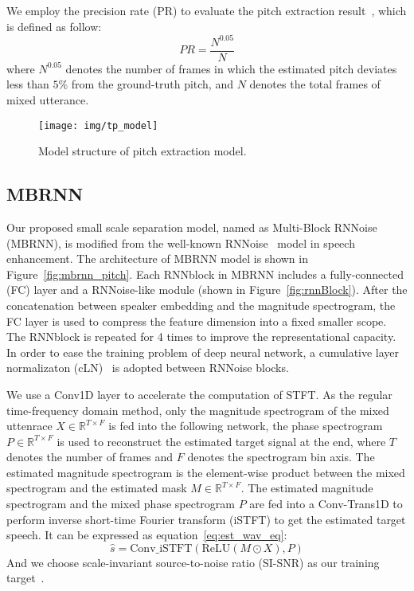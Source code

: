 \documentclass[
]{article}
\begin{document}
    We employ the precision rate (PR) to evaluate the pitch extraction result~\cite{zhang16d_interspeech}, which is defined as follow:
    \begin{equation}
        PR =\frac{N^{0.05}}{N}
    \end{equation}
    where ${N^{0.05}}$ denotes the number of frames in which the estimated pitch deviates less than $5\%$ from the ground-truth pitch, and $N$ denotes the total frames of mixed utterance.

    \begin{figure}[t]
        \centering
        \texttt{[image: img/tp\_model]}
        \caption{Model structure of pitch extraction model.}
        \label{fig:tp_extraction}
    \end{figure}

    \subsection{MBRNN}
    \label{subsec:mbrnn_model}
    Our proposed small scale separation model, named as Multi-Block RNNoise (MBRNN), is modified from the well-known RNNoise~\cite{rnnoise} model in speech enhancement.
    The architecture of MBRNN model is shown in Figure~\ref{fig:mbrnn_pitch}. Each RNNblock in MBRNN includes a fully-connected (FC) layer and a RNNoise-like module (shown in Figure~\ref{fig:rnnBlock}).
    After the concatenation between speaker embedding and the magnitude spectrogram, the FC layer is used to compress the feature dimension into a fixed smaller scope.
    The RNNblock is repeated for 4 times to improve the representational capacity.
    In order to ease the training problem of deep neural network, a cumulative layer normalizaton (cLN)~\cite{conv_tasnet} is adopted between RNNoise blocks.

    We use a Conv1D layer to accelerate the computation of STFT.
    As the regular time-frequency domain method, only the magnitude spectrogram of the mixed uttenrace $X\in\mathbb{R}^{T\times F}$ is fed into the following network, the phase spectrogram $P\in\mathbb{R}^{T\times F}$ is used to reconstruct the estimated target signal at the end, where $T$ denotes the number of frames and $F$ denotes the spectrogram bin axis.
    The estimated magnitude spectrogram is the element-wise product between the mixed spectrogram and the estimated mask $M\in\mathbb{R}^{T\times F}$. The estimated magnitude spectrogram and the mixed phase spectrogram $P$ are fed into a Conv-Trans1D to perform inverse short-time Fourier transform (iSTFT) to get the estimated target speech.
    It can be expressed as equation~\ref{eq:est_wav_eq}:
    \begin{equation}
        \label{eq:est_wav_eq}
        \hat{s} = \text{Conv\_iSTFT}\left( \text{ReLU}\left( M\odot X \right), P \right)
    \end{equation}
    And we choose scale-invariant source-to-noise ratio (SI-SNR) as our training target~\cite{tasnet}.
\end{document}

